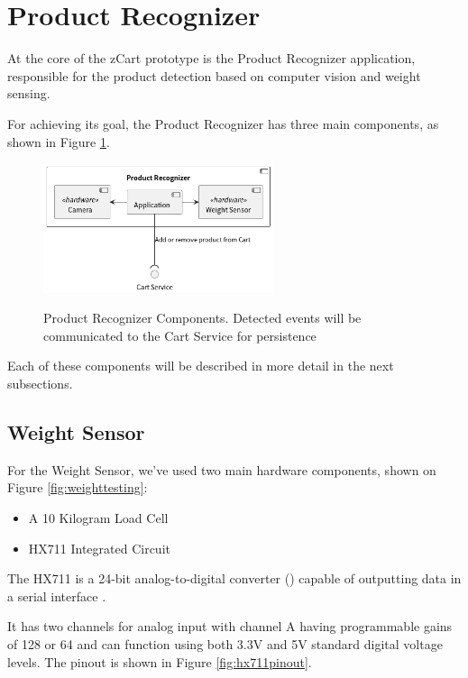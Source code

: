 \section{Product Recognizer}

At the core of the zCart prototype is the Product Recognizer application,
responsible for the product detection based on computer vision and weight
sensing.

For achieving its goal, the Product Recognizer has three main components, as shown in Figure
\ref{fig:productrecognizerarch}.

\begin{figure}[H]
	\centering
	\caption[Product Recognizer Components]{Product Recognizer Components. Detected events will be communicated to the Cart Service for persistence}
    \includegraphics[width=0.6\textwidth]{./images/diagrams/ProductRecognizer.png}
	\fonte{}
	\label{fig:productrecognizerarch}
\end{figure}

Each of these components will be described in more detail in the next subsections.

\subsection{Weight Sensor}

For the Weight Sensor, we've used two main hardware components, shown on Figure \ref{fig:weighttesting}:
\begin{itemize}
    \item  A 10 Kilogram Load Cell
    \item HX711 Integrated Circuit
\end{itemize}

The HX711 is a 24-bit analog-to-digital converter ()
capable of outputting data in a serial interface \cite{Avia2022}.

It has two channels for analog input with channel A having programmable gains of 128 or 64 and
can function using both 3.3V and 5V standard digital voltage levels. The pinout is shown
in Figure \ref{fig:hx711pinout}.

